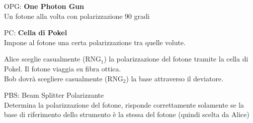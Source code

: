 \documentclass[10pt]{book}
\begin{document}
\begin{list}{}{}
	\item OPG: \textbf{One Photon Gun}\\
	Un fotone alla volta con polarizzazione 90 gradi
	\item PC: \textbf{Cella di Pokel}\\
	Impone al fotone una certa polarizzazione tra quelle volute.
	\item Alice sceglie casualmente (RNG$_1$) la polarizzazione del fotone tramite la cella di Pokel. Il fotone viaggia su fibra ottica.\\
	Bob dovrà scegliere casualmente (RNG$_2$) la base attraverso il deviatore.
	\item PBS: Beam Splitter Polarizzante\\
	Determina la polarizzazione del fotone, risponde correttamente solamente se la base di riferimento dello strumento è la stessa del fotone (quindi scelta da Alice)
\end{list}
\end{document}
